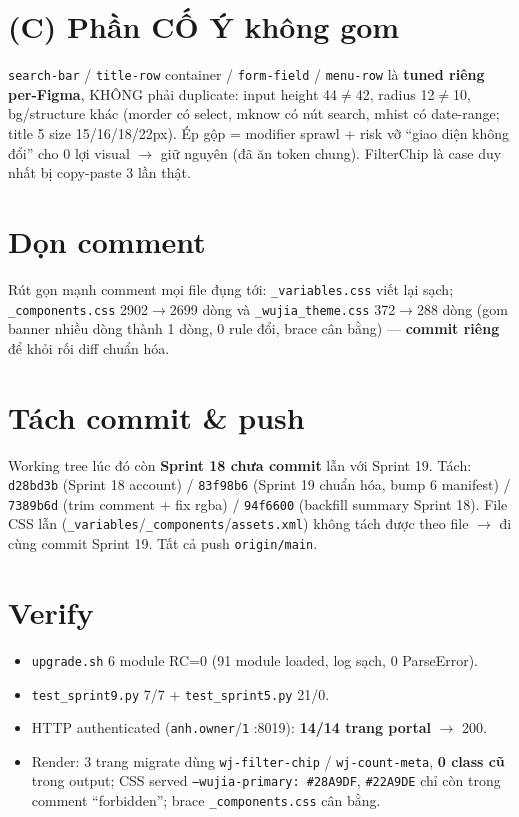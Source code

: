 \section{(C) Phần CỐ Ý không gom}

\texttt{search-bar} / \texttt{title-row} container / \texttt{form-field} / \texttt{menu-row}
là \textbf{tuned riêng per-Figma}, KHÔNG phải duplicate: input height 44\(\neq\)42, radius
12\(\neq\)10, bg/structure khác (morder có select, mknow có nút search, mhist có date-range;
title 5 size 15/16/18/22px). Ép gộp = modifier sprawl + risk vỡ ``giao diện không đổi'' cho 0
lợi visual \(\rightarrow\) giữ nguyên (đã ăn token chung). FilterChip là case duy nhất bị
copy-paste 3 lần thật.

\section{Dọn comment}

Rút gọn mạnh comment mọi file đụng tới: \texttt{\_variables.css} viết lại sạch;
\texttt{\_components.css} 2902\(\rightarrow\)2699 dòng và \texttt{\_wujia\_theme.css}
372\(\rightarrow\)288 dòng (gom banner nhiều dòng thành 1 dòng, 0 rule đổi, brace cân bằng) ---
\textbf{commit riêng} để khỏi rối diff chuẩn hóa.

\section{Tách commit \& push}

Working tree lúc đó còn \textbf{Sprint 18 chưa commit} lẫn với Sprint 19. Tách:
\texttt{d28bd3b} (Sprint 18 account) / \texttt{83f98b6} (Sprint 19 chuẩn hóa, bump 6 manifest) /
\texttt{7389b6d} (trim comment + fix rgba) / \texttt{94f6600} (backfill summary Sprint 18).
File CSS lẫn (\texttt{\_variables}/\texttt{\_components}/\texttt{assets.xml}) không tách được
theo file \(\rightarrow\) đi cùng commit Sprint 19. Tất cả push \texttt{origin/main}.

\section{Verify}

\begin{itemize}
  \item \texttt{upgrade.sh} 6 module RC=0 (91 module loaded, log sạch, 0 ParseError).
  \item \texttt{test\_sprint9.py} 7/7 + \texttt{test\_sprint5.py} 21/0.
  \item HTTP authenticated (\texttt{anh.owner}/\texttt{1} :8019): \textbf{14/14 trang portal}
        \(\rightarrow\) 200.
  \item Render: 3 trang migrate dùng \texttt{wj-filter-chip} / \texttt{wj-count-meta},
        \textbf{0 class cũ} trong output; CSS served \texttt{--wujia-primary: \#28A9DF},
        \texttt{\#22A9DE} chỉ còn trong comment ``forbidden''; brace \texttt{\_components.css}
        cân bằng.
\end{itemize}

